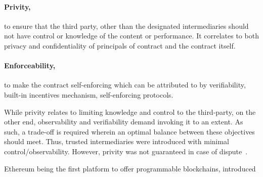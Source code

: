 \paragraph{Privity,}to ensure that the third party, other than the designated
intermediaries should not have control or knowledge of the content or
performance. It correlates to both privacy and confidentiality of principals of
contract and the contract itself. 
\paragraph{Enforceability,}to make the contract self-enforcing which can be
attributed to by verifiability, built-in incentives mechanism, self-enforcing
protocols. \par
While privity relates to limiting knowledge and control to the third-party, on
the other end, observability and verifiability demand invoking it to an extent.
As such, a trade-off is required wherein an optimal balance between these
objectives should meet. Thus, trusted intermediaries were introduced with
minimal control/observability.  However, privity was not guaranteed in case of
dispute~\cite{szabo1997formalizing}. \par
Ethereum being the first platform to offer programmable blockchains, introduced
